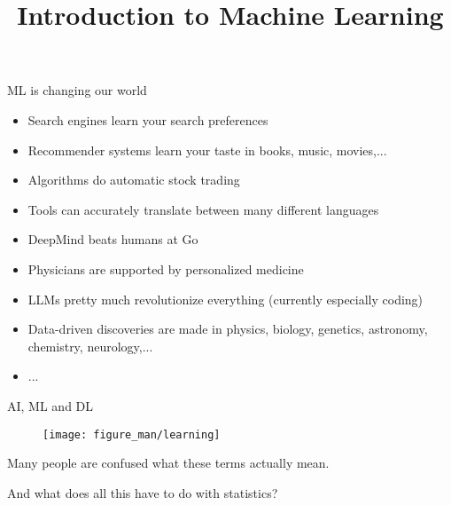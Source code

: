 \documentclass[11pt,compress,t,notes=noshow, xcolor=table]{beamer}
\title{Introduction to Machine Learning}
\begin{document}


\begin{frame}{ML is changing our world}

\begin{itemize}

  \item Search engines learn your search preferences
  
  \item Recommender systems learn your taste in books, music, movies,...
  
  \item Algorithms do automatic stock trading
 

  \item Tools can accurately translate between many different languages
    
  \item DeepMind beats humans at Go
  
  \item Physicians are supported by personalized medicine

  \item LLMs pretty much revolutionize everything (currently especially coding)
  
  \item Data-driven discoveries are made in physics, biology, genetics, 
  astronomy, chemistry, neurology,...
  
  \item ...
  
\end{itemize}

\end{frame}


\begin{frame}{AI, ML and DL}

\begin{center}

  \begin{figure}
    \texttt{[image: figure\_man/learning]} 
  \end{figure}
  \end{center}
  \lz

Many people are confused what these terms actually mean. 

\lz

And what does all this have to do with statistics?

  
\end{frame}
\end{document}
